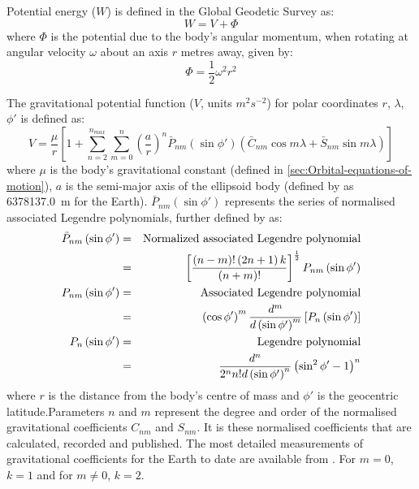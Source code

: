 Potential energy ($W$) is defined in the Global Geodetic Survey \parencite{WGS84} as:
\begin{equation}
W=V+\Phi\label{eq:Total-Grav-Potential}
\end{equation}
where $\Phi$ is the potential due to the body's angular momentum, when rotating at angular velocity $\omega$ about an axis $r$ metres away, given by:
\begin{equation}
\Phi=\frac{1}{2}\omega^{2}r^{2}\label{eq:Angular-Momentum}
\end{equation}


The gravitational potential function ($V$, units $m^{2}s^{-2}$) for polar coordinates $r$, $\lambda$, $\phi'$ is defined as:
\begin{equation}
V=\frac{\mu}{r}\left[1+\sum_{n=2}^{n_{max}}\sum_{m=0}^{n}\left(\frac{a}{r}\right)^{n}\bar{P}_{nm}\left(\sin\phi'\right)\left(\bar{C}_{nm}\cos m\lambda+\bar{S}_{nm}\sin m\lambda\right)\right]
\label{eq:Grav-Potential}
\end{equation}
where $\mu$ is the body's gravitational constant (defined in \autoref{sec:Orbital-equations-of-motion}), $a$ is the semi-major axis of the ellipsoid body (defined by \citeauthor{WGS84} as 6378137.0~m for the Earth). $\bar{P}_{nm}\left(\sin\phi'\right)$ represents the series of normalised associated Legendre polynomials, further defined by \textcite{WGS84}  as:
\begin{eqnarray}\notag
\bar{P}_{nm}\left(\sin\phi'\right) & = & \text{Normalized associated Legendre polynomial}\\
 & = & \left[\frac{\left(n-m\right)!\left(2n+1\right)k}{\left(n+m\right)!}\right]^{\frac{1}{2}}P_{nm}\left(\sin\phi'\right)\\\notag
P_{nm}\left(\sin\phi'\right) & = & \text{Associated Legendre polynomial}\\
 & = & \left(\cos\phi'\right)^{m}\frac{d^{m}}{d\left(\sin\phi'\right)^{m}}\left[P_{n}\left(\sin\phi'\right)\right]\\\notag
P_{n}\left(\sin\phi'\right) & = & \text{Legendre polynomial}\\
 & = & \frac{d^{n}}{2^{n}n!d\left(\sin\phi'\right)^{n}}\left(\sin^{2}\phi'-1\right)^{n}
\end{eqnarray}
where $r$ is the distance from the body's centre of mass and $\phi'$ is the geocentric latitude.Parameters $n$ and $m$ represent the degree and order of the normalised gravitational coefficients $C_{nm}$ and $S_{nm}$. It is these normalised coefficients that are calculated, recorded and published. The most detailed measurements of gravitational coefficients for the Earth to date are available from \textcite{EIGEN-5C}.  For $m = 0$, $k = 1$ and for $m \neq 0$, $k = 2$. 

